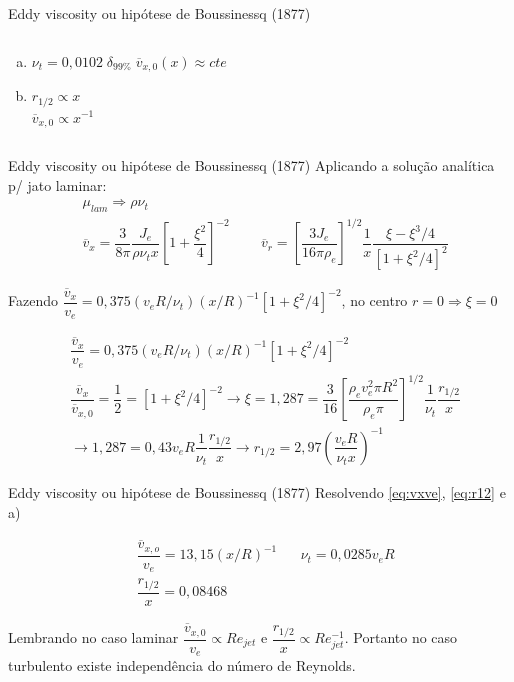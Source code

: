 \documentclass[10pt]{beamer}
\newcommand{\m}[1]{\overline{#1}}
\begin{document}
\begin{frame}{Eddy viscosity ou hipótese de Boussinessq (1877)}
\begin{columns}
\begin{column}{0.5\textwidth}
\begin{figure}
				\label{fig:jetvel}
			\end{figure}
			\begin{enumerate}[a)]
				\item $\nu_t = 0,0102 \; \delta_{99\%} \; \m{v}_{x,0}(x) \approx cte$
				\item $r_{1/2} \propto x$ \\ $\m{v}_{x,0} \propto x^{-1}$
			\end{enumerate}

		\end{column}
	\end{columns}
\end{frame}

\begin{frame}{Eddy viscosity ou hipótese de Boussinessq (1877)}
	Aplicando a solução analítica p/ jato laminar:
	\begin{align*}
	&\mu_{lam} \Rightarrow \rho \nu_t \\
	&\m{v}_x = \dfrac{3}{8 \pi} \dfrac{J_e}{\rho \nu_t x}\left[ 1 + \dfrac{\xi^2}{4} \right]^{-2}
	\;\;\;\;\;\;\;\;
	\m{v}_r = \left[ \dfrac{3 J_e}{16 \pi \rho_e} \right]^{1/2} \dfrac{1}{x}\dfrac{\xi - \xi^3/4}{[1 + \xi^2/4]^2}
	\end{align*}
	
	Fazendo $ \dfrac{\m{v}_x}{v_e} = 0,375 (v_e R/\nu_t)(x/R)^{-1}[1 + \xi^2/4]^{-2} $, no centro $ r = 0 \Rightarrow \xi = 0 $
	
	\begin{align}
		 &\dfrac{\m{v}_x}{v_e} = 0,375 (v_e R/\nu_t)(x/R)^{-1}[1 + \xi^2/4]^{-2} \label{eq:vxve}\\
		 &\dfrac{\m{v}_x}{\m{v}_{x,0}} = \dfrac{1}{2} = \left[ 1 + \xi^2/4 \right]^{-2}
		 \rightarrow \xi = 1,287 = \dfrac{3}{16}\left[ \dfrac{\rho_e v_e^2 \pi R^2}{\rho_e \pi} \right]^{1/2}\dfrac{1}{\nu_t}\dfrac{r_{1/2}}{x} \nonumber \\
		 &\rightarrow 1,287 = 0,43 v_e R \dfrac{1}{\nu_t}\dfrac{r_{1/2}}{x} 
		 \rightarrow r_{1/2} = 2,97 \left( \dfrac{v_e R}{\nu_t x} \right)^{-1}\label{eq:r12}
	\end{align}
	
\end{frame}


\begin{frame}{Eddy viscosity ou hipótese de Boussinessq (1877)}
	Resolvendo \ref{eq:vxve}, \ref{eq:r12} e a)
	
	\begin{align*}
	&\dfrac{\m{v}_{x,o}}{v_e} = 13,15 (x/R)^{-1} \;\;\;\;\;\; \nu_t = 0,0285 v_e R \\
	& \dfrac{r_{1/2}}{x} = 0,08468
	\end{align*}
	
	Lembrando no caso laminar $ \dfrac{\m{v}_{x,0}}{v_e} \propto Re_{jet} $ e $ \dfrac{r_{1/2}}{x} \propto Re_{jet}^{-1}$. Portanto no caso turbulento existe independência do número de Reynolds.
\end{frame}
\end{document}
